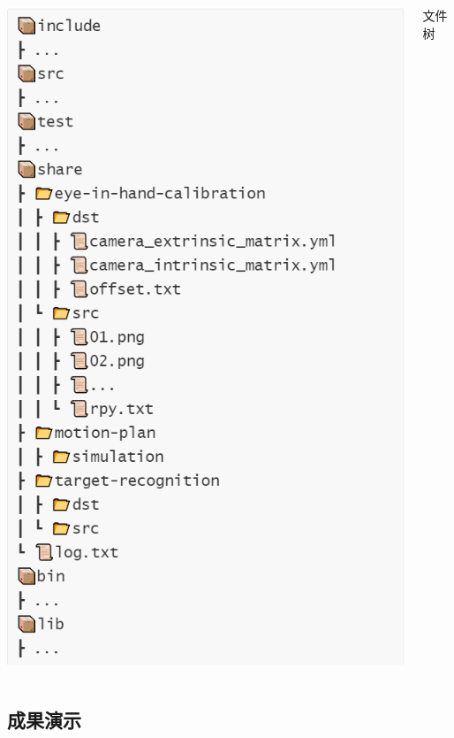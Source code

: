 \documentclass{beamer}
\begin{document}
\begin{frame}
\begin{columns}[onlytextwidth,T]
        \includegraphics[scale=0.25]{file-tree.png}\\
        \begin{center}
            文件树
        \end{center}
    \end{columns}
\end{frame}


\subsection{成果演示}
\end{document}
